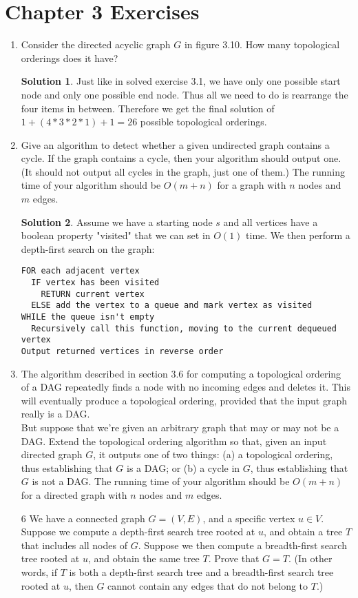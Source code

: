 \documentclass[12pt]{article}
\theoremstyle{definition}
\newtheorem*{solution}{Solution} %
\theoremstyle{plain}
\begin{document}
\section{Chapter 3 Exercises}
\begin{enumerate}
\item Consider the directed acyclic graph $G$ in figure 3.10. How many topological orderings does it have?
\begin{solution}
Just like in solved exercise 3.1, we have only one possible start node and only one possible end node. Thus all we need to do is rearrange the four items in between. Therefore we get the final solution of $1+(4*3*2*1)+1 = 26$ possible topological orderings.
\end{solution}

\item Give an algorithm to detect whether a given undirected graph contains a cycle. If the graph contains a cycle, then your algorithm should output one. (It should not output all cycles in the graph, just one of them.) The running time of your algorithm should be $O(m+n)$ for a graph with $n$ nodes and $m$ edges.
\begin{solution}
Assume we have a starting node $s$ and all vertices have a boolean property "visited" that we can set in $O(1)$ time. We then perform a depth-first search on the graph:
\begin{verbatim}
FOR each adjacent vertex
  IF vertex has been visited
    RETURN current vertex
  ELSE add the vertex to a queue and mark vertex as visited
WHILE the queue isn't empty
  Recursively call this function, moving to the current dequeued vertex
Output returned vertices in reverse order
\end{verbatim}
\end{solution}

\item The algorithm described in section 3.6 for computing a topological ordering of a DAG repeatedly finds a node with no incoming edges and deletes it. This will eventually produce a topological ordering, provided that the input graph really is a DAG.\\
But suppose that we're given an arbitrary graph that may or may not be a DAG. Extend the topological ordering algorithm so that, given an input directed graph $G$, it outputs one of two things: (a) a topological ordering, thus establishing that $G$ is a DAG; or (b) a cycle in $G$, thus establishing that $G$ is not a DAG. The running time of your algorithm should be $O(m+n)$ for a directed graph with $n$ nodes and $m$ edges.
\item[6] We have a connected graph $G=(V,E)$, and a specific vertex $u\in V$. Suppose we compute a depth-first search tree rooted at $u$, and obtain a tree $T$ that includes all nodes of $G$. Suppose we then compute a breadth-first search tree rooted at $u$, and obtain the same tree $T$. Prove that $G=T$. (In other words, if $T$ is both a depth-first search tree and a breadth-first search tree rooted at $u$, then $G$ cannot contain any edges that do not belong to $T$.)
\end{enumerate}
\end{document}
